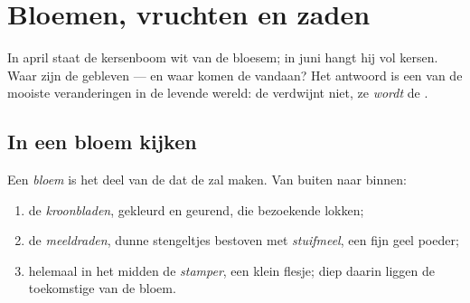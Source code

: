 \chapter{Bloemen, vruchten en zaden}\label{ch:g3:flowers-fruits-seeds}

In april staat de kersenboom wit van de bloesem; in juni hangt hij vol
kersen. Waar zijn de  gebleven --- en waar komen de 
vandaan? Het antwoord is een van de mooiste veranderingen in de levende
wereld: de  verdwijnt niet, ze \emph{wordt} de .

\section{In een bloem kijken}

\begin{definition}\label{def:g3:flowers-fruits-seeds:parts}
Een \emph{bloem} is het deel van de  dat de  zal
maken. Van buiten naar binnen:
\begin{enumerate}
  \item de \emph{kroonbladen}, gekleurd en geurend,
        die bezoekende  lokken;
  \item de \emph{meeldraden}, dunne stengeltjes
        bestoven met \emph{stuifmeel}, een fijn geel poeder;
  \item helemaal in het midden de \emph{stamper}, een
        klein flesje; diep daarin liggen de toekomstige  van de bloem.
\end{enumerate}
\end{definition}

